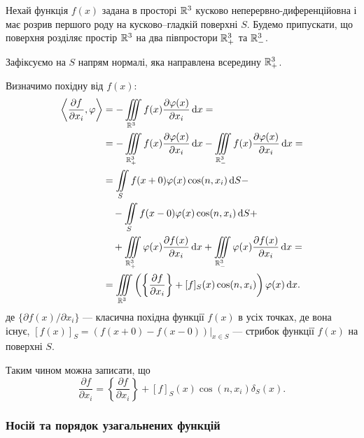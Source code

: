 \begin{example}
	Нехай функція $f(x)$ задана в просторі $\mathbb{R}^3$ кусково неперервно-ди\-фе\-рен\-ці\-йов\-на і має розрив першого роду на кусково–гладкій поверхні $S$. Будемо припускати, що поверхня   розділяє простір $\mathbb{R}^3$ на два півпростори $\mathbb{R}_+^3$ та $\mathbb{R}_-^3$.
\end{example}

\begin{solution}
	Зафіксуємо на $S$ напрям нормалі, яка направлена всередину $\mathbb{R}_+^3$. \medskip

	Визначимо похідну від $f(x)$:
	\begin{equation}
		\begin{aligned}
			\langle \frac{\partial f}{\partial x_i}, \phi \rangle &= - \Iiint_{\RR^3} f(x) \frac{\partial \phi(x)}{\partial x_i} \diff x = \\
			&= - \Iiint_{\RR_+^3} f(x) \frac{\partial \phi(x)}{\partial x_i} \diff x - \Iiint_{\RR_-^3} f(x) \frac{\partial \phi(x)}{\partial x_i} \diff x = \\
			&= \Iint_S f(x + 0) \phi(x) \cos(n, x_i) \diff S - \\
			&\quad- \Iint_S f(x - 0) \phi(x) \cos(n, x_i) \diff S + \\
			&\quad + \Iiint_{\RR_+^3} \phi(x) \frac{\partial f(x)}{\partial x_i} \diff x + \Iiint_{\RR_-^3} \phi(x) \frac{\partial f(x)}{\partial x_i} \diff x = \\
			&= \Iiint_{\RR^3} \left(  \left\{ \frac{\partial f}{\partial x_i}\right\} + [f]_S(x) \cos(n, x_i) \right) \phi(x) \diff x.
		\end{aligned}	
	\end{equation}
	де $\{\partial f(x) / \partial x_i\}$ --- класична похідна функції $f(x)$ в усіх точках, де вона існує, $[f(x)]_S = \left.(f(x + 0) - f(x - 0))\right|_{x \in S}$ --- стрибок функції $f(x)$ на поверхні $S$. \medskip

	Таким чином можна записати, що 
	\begin{equation}
		\frac{\partial f}{\partial x_i} = \left\{ \frac{\partial f}{\partial x_i}\right\} + [f]_S(x) \cos(n, x_i) \delta_S(x).
	\end{equation}
\end{solution}

\subsubsection{Носій та порядок узагальнених функцій}

